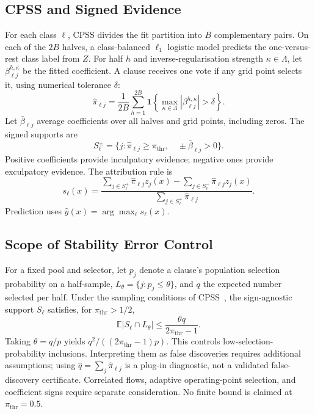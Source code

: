 \documentclass[conference]{IEEEtran}
\begin{document}
\subsection{CPSS and Signed Evidence}
\label{sec:cpss}
For each class $\ell$, CPSS divides the fit partition into $B$
complementary pairs. On each of the $2B$ halves, a class-balanced
$\ell_1$ logistic model predicts the one-versus-rest class label from
$Z$. For half $h$ and inverse-regularisation strength
$\kappa\in\Lambda$, let $\beta_{\ell j}^{h,\kappa}$ be the fitted
coefficient. A clause receives one vote if any grid point selects it,
using numerical tolerance $\delta$:
\begin{equation}
 \hat\pi_{\ell j}=\frac{1}{2B}\sum_{h=1}^{2B}
 \mathbf1\!\left\{\max_{\kappa\in\Lambda}
             |\beta_{\ell j}^{h,\kappa}|>\delta\right\}.
 \label{eq:stability}
\end{equation}
Let $\bar\beta_{\ell j}$ average coefficients over all halves and
grid points, including zeros. The signed supports are
\begin{equation}
 S_\ell^\pm=\{j:\hat\pi_{\ell j}\ge\pi_{\mathrm{thr}},\quad
                                  \pm\bar\beta_{\ell j}>0\}.
 \label{eq:sign}
\end{equation}
Positive coefficients provide inculpatory evidence; negative ones
provide exculpatory evidence. The attribution rule is
\begin{equation}
 s_\ell(x)=\frac{\sum_{j\in S_\ell^+}\hat\pi_{\ell j}z_j(x)
                 -\sum_{j\in S_\ell^-}\hat\pi_{\ell j}z_j(x)}
                {\sum_{j\in S_\ell^+}\hat\pi_{\ell j}}.
 \label{eq:score}
\end{equation}
Prediction uses $\hat y(x)=\arg\max_\ell s_\ell(x)$.

\subsection{Scope of Stability Error Control}
\label{sec:cert}
For a fixed pool and selector, let $p_j$ denote a clause's population
selection probability on a half-sample, $L_\theta=\{j:p_j\le\theta\}$,
and $q$ the expected number selected per half. Under the sampling
conditions of CPSS~\cite{shah2013}, the sign-agnostic support $S_\ell$
satisfies, for $\pi_{\mathrm{thr}}>1/2$,
\begin{equation}
 \mathbb E|S_\ell\cap L_\theta|
 \le\frac{\theta q}{2\pi_{\mathrm{thr}}-1}.
 \label{eq:bound}
\end{equation}
Taking $\theta=q/p$ yields $q^2/((2\pi_{\mathrm{thr}}-1)p)$.
This controls low-selection-probability inclusions. Interpreting them
as false discoveries requires additional assumptions; using
$\hat q=\sum_j\hat\pi_{\ell j}$ is a plug-in diagnostic, not a
validated false-discovery certificate. Correlated flows, adaptive
operating-point selection, and coefficient signs require separate
consideration. No finite bound is claimed at $\pi_{\mathrm{thr}}=0.5$.
\end{document}

